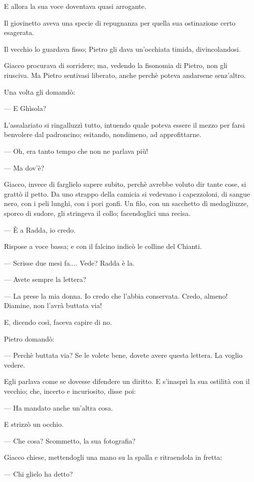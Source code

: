E allora la sua voce doventava quasi arrogante.

Il giovinetto aveva una specie di repugnanza per quella sua ostinazione certo esagerata.

Il vecchio lo guardava fisso; Pietro gli dava un'occhiata timida, divincolandosi.

Giacco procurava di sorridere; ma, vedendo la fisonomia di Pietro, non gli riusciva. Ma Pietro sentivasi liberato, anche perchè poteva andarsene senz'altro.

Una volta gli domandò:

— E Ghìsola?

L'assalariato si ringalluzzì tutto, intuendo quale poteva essere il mezzo per farsi benvolere dal padroncino; esitando, nondimeno, ad approfittarne.

— Oh, era tanto tempo che non ne parlava più!

— Ma dov'è?

Giacco, invece di farglielo sapere subito, perchè avrebbe voluto dir tante cose, si grattò il petto. Da uno strappo della camicia si vedevano i capezzoloni, di sangue nero, con i peli lunghi, con i pori gonfi. Un filo, con un sacchetto dì medagliuzze, sporco di sudore, gli stringeva il collo; facendoglici una recisa.

— È a Radda, io credo.

Rispose a voce bassa; e con il falcino indicò le colline del Chianti.

— Scrisse due mesi fa.... Vede? Radda è la.

— Avete sempre la lettera?

— La prese la mia donna. Io credo che l'abbia conservata. Credo, almeno! Diamine, non l'avrà buttata via!

E, dicendo così, faceva capire di no.

Pietro domandò:

— Perchè buttata via? Se le volete bene, dovete avere questa lettera. La voglio vedere.

Egli parlava come se dovesse difendere un diritto. E s’inasprì la sua ostilità con il vecchio; che, incerto e incuriosito, disse poi:

— Ha mandato anche un’altra cosa.

E strizzò un occhio.

— Che cosa? Scommetto, la sua fotografia?

Giacco chiese, mettendogli una mano su la spalla e ritraendola in fretta:

— Chi glielo ha detto?

